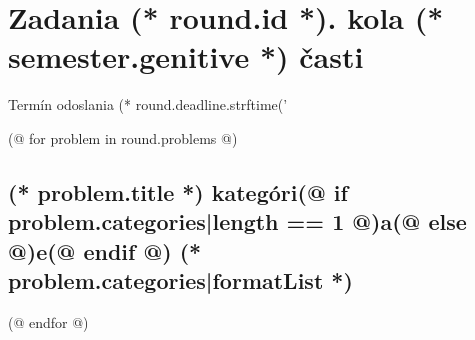 \documentclass[12pt, twoside]{article}
\newcounter{volume}
\newcounter{semester}
\newcounter{round}
\newcounter{problem}
\begin{document}
    \loadRegularStyle
    \thispagestyle{first}
    \vspace*{2em}

    {
        \section{\texorpdfstring{Zadania (* round.id *). kola (* semester.genitive *) časti}{Zadania}}
        \centering
        \vspace{-1.3em}
        Termín odoslania (* round.deadline.strftime('%
    } 
        
    \pagestyle{problems}    
    \loadProblemsStyle

    (@ for problem in round.problems @)
    \setcounter{volume}{(* volume.id *)}%
    \setcounter{semester}{(* semester.id *)}%
    \setcounter{round}{(* round.id *)}%
    \setcounter{problem}{(* problem.id *)}%

    \subsection{%
        \texorpdfstring{%
            \large \textbf{(* problem.title *)}%
            \normalsize \hfill kategóri(@ if problem.categories|length == 1 @)a(@ else @)e(@ endif @) (* problem.categories|formatList *)%
        }{%
            (* problem.title *)%
        }%
    }%
    (@ endfor @)
\end{document}
